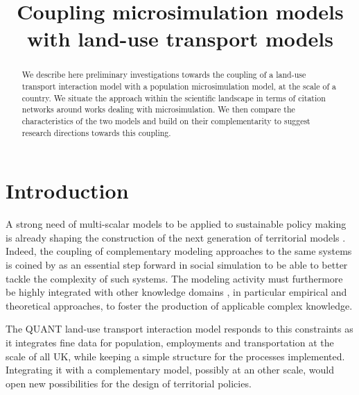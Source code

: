 



\title{Coupling microsimulation models with land-use transport models}

\date{}

\maketitle

\justify


\begin{abstract}
	We describe here preliminary investigations towards the coupling of a land-use transport interaction model with a population microsimulation model, at the scale of a country. We situate the approach within the scientific landscape in terms of citation networks around works dealing with microsimulation. We then compare the characteristics of the two models and build on their complementarity to suggest research directions towards this coupling. 
\end{abstract}




\section{Introduction}


A strong need of multi-scalar models to be applied to sustainable policy making is already shaping the construction of the next generation of territorial models \cite{Rozenblat2018}. Indeed, the coupling of complementary modeling approaches to the same systems is coined by \cite{banos2013pour} as an essential step forward in social simulation to be able to better tackle the complexity of such systems. The modeling activity must furthermore be highly integrated with other knowledge domains \cite{raimbault2017applied}, in particular empirical and theoretical approaches, to foster the production of applicable complex knowledge.

The QUANT land-use transport interaction model \cite{batty2019generalized} responds to this constraints as it integrates fine data for population, employments and transportation at the scale of all UK, while keeping a simple structure for the processes implemented. Integrating it with a complementary model, possibly at an other scale, would open new possibilities for the design of territorial policies.

